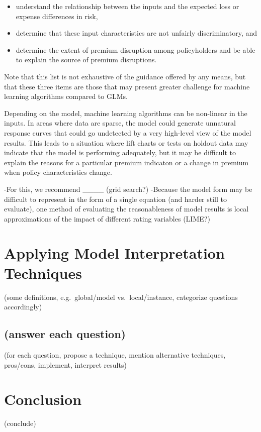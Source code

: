 \documentclass[]{interact}
\theoremstyle{plain}%
\theoremstyle{definition}
\theoremstyle{remark}
\begin{document}
\begin{itemize}
\tightlist
\item
  understand the relationship between the inputs and the expected loss
  or expense differences in risk,
\item
  determine that these input characteristics are not unfairly
  discriminatory, and
\item
  determine the extent of premium disruption among policyholders and be
  able to explain the source of premium disruptions.
  \citep{naic_white_paper}
\end{itemize}

Note that this list is not exhaustive of the guidance offered by any
means, but that these three items are those that may present greater
challenge for machine learning algorithms compared to GLMs.

Depending on the model, machine learning algorithms can be non-linear in
the inputs. In areas where data are sparse, the model could generate
unnatural response curves that could go undetected by a very high-level
view of the model results. This leads to a situation where lift charts
or tests on holdout data may indicate that the model is performing
adequately, but it may be difficult to explain the reasons for a
particular premium indicaton or a change in premium when policy
characteristics change.

-For this, we recommend \_\_\_\_ (grid search?) -Because the model form
may be difficult to represent in the form of a single equation (and
harder still to evaluate), one method of evaluating the reasonableness
of model results is local approximations of the impact of different
rating variables (LIME?)

\section{Applying Model Interpretation Techniques}\label{application}

(some definitions, e.g.~global/model vs.~local/instance, categorize
questions accordingly)

\subsection{(answer each question)}\label{answer-each-question}

(for each question, propose a technique, mention alternative techniques,
pros/cons, implement, interpret results)

\section{Conclusion}\label{conclusion}

(conclude)






\end{document}
